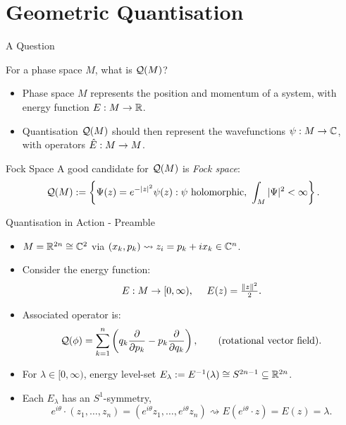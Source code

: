 \section{Geometric Quantisation}

\begin{frame}{A Question}

    For a phase space $M$, what is $\mathcal{Q}(M)$?

    \begin{itemize}
        \item Phase space $M$ represents the position and momentum of a system, with energy function $E : M \rightarrow \mathbb{R}$.
        \item Quantisation $\mathcal{Q}(M)$ should then represent the wavefunctions $\psi : M \rightarrow \mathbb{C}$, with operators $\hat{E} : M \rightarrow M$.
    \end{itemize}

    \begin{block}{Fock Space}
        A good candidate for $\mathcal{Q}(M)$ is \emph{Fock space}:
        \begin{equation*}
            \mathcal{Q}(M) := \left\{ \Psi(z) = e^{-|z|^{2}}\psi(z) : \psi \text{ holomorphic},\ \int_{M} |\Psi|^{2} < \infty \right\}.
        \end{equation*}
    \end{block}

\end{frame}

\begin{frame}{Quantisation in Action - Preamble}

    \begin{itemize}
        \item $M = \mathbb{R}^{2n} \cong \mathbb{C}^{2}$ via $(x_{k}, p_{k}) \rightsquigarrow z_{i} = p_{k} + ix_{k} \in \mathbb{C}^{n}$.
        \item Consider the energy function: 
        $$ E : M \rightarrow [0,\infty), \quad\ E(z) = \tfrac{\|z\|^{2}}{2}. $$
        \item Associated operator is:
        $$ \mathcal{Q}(\phi) = \sum_{k=1}^{n} \left( q_{k} \frac{\partial}{\partial p_{k}} - p_{k} \frac{\partial}{\partial q_{k}} \right), \qquad \text{(rotational vector field).} $$
        \item For $\lambda \in [0,\infty)$, energy level-set $E_{\lambda} := E^{-1}(\lambda) \cong S^{2n-1} \subseteq \mathbb{R}^{2n}$.
        \item Each $E_{\lambda}$ has an $S^{1}$-symmetry,
        $$ e^{i\theta}\cdot (z_{1}, \ldots, z_{n}) = (e^{i\theta}z_{1}, \ldots, e^{i\theta}z_{n}) \rightsquigarrow E(e^{i\theta}\cdot z) = E(z) = \lambda. $$
    \end{itemize}

\end{frame}

